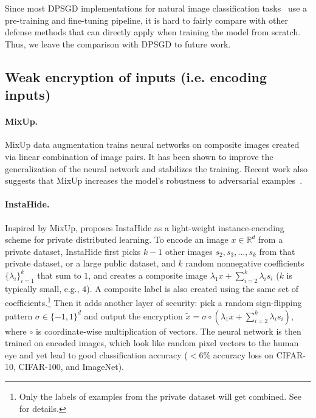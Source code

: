 Since most DPSGD implementations for natural image classification tasks~\citep{abadi2016deep, papernot2020making, tramer2020differentially} use a pre-training and fine-tuning pipeline, it is hard to fairly compare with other defense methods that can directly apply when training the model from scratch. Thus, we leave the comparison with DPSGD to future work.



\subsection{Weak encryption of inputs (i.e. encoding inputs)}

\paragraph{MixUp.} MixUp data augmentation \citep{zhang2017mixup} trains neural networks on composite images created via linear combination of image pairs. It has been shown to improve the generalization of the neural network and stabilizes the training. Recent work also suggests that MixUp increases the model's robustness to adversarial examples~\citep{pang2019mixup, lamb2019interpolated}. 

\paragraph{InstaHide.} Inspired by MixUp, \citep{huang2020instahide} proposes InstaHide as a light-weight instance-encoding scheme for private distributed learning. To encode an image $x \in {\mathbb R}^d$ from a private dataset, InstaHide first picks $k-1$ other images $s_2, s_3, \ldots, s_k$ from that private dataset, or a large public dataset, and $k$ random nonnegative coefficients $\{\lambda_i\}_{i=1}^k$ that sum to $1$, and creates a composite image $\lambda_1 x + \sum_{i=2}^k \lambda_i s_i$ ($k$ is typically small, e.g., $4$). A composite label is also created using the same set of coefficients.\footnote{Only the labels of examples from the private dataset will get combined. See \citep{huang2020instahide} for details.} Then it adds another layer of security: pick a random sign-flipping pattern $\sigma \in \{-1, 1\}^d$ and output the encryption $\tilde{x} = \sigma\circ (\lambda_1 x + \sum_{i=2}^k \lambda_i s_i)$, where $\circ$ is coordinate-wise multiplication of vectors.
The neural network is then trained on encoded images, which look like random pixel vectors to the human eye and yet lead to  good classification accuracy ($<6\%$ accuracy loss on CIFAR-10, CIFAR-100, and ImageNet).


